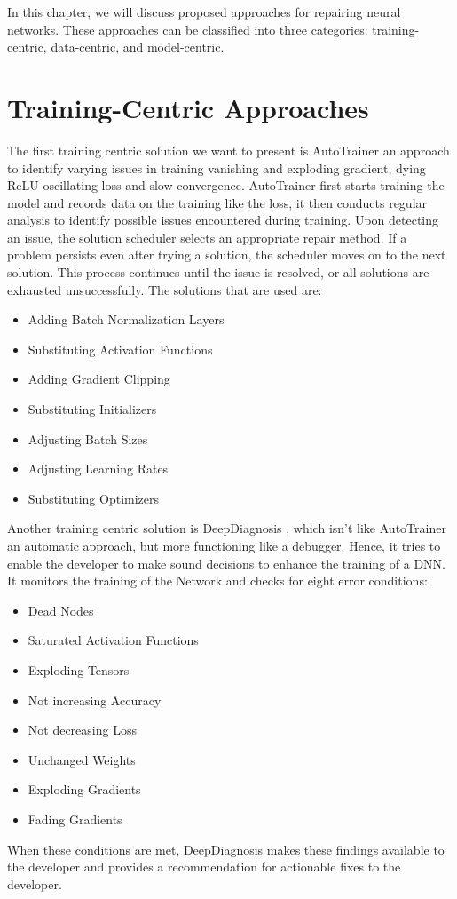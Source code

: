 In this chapter, we will discuss proposed approaches for repairing neural networks.
These approaches \cite{nakagawa_experience_2023} can be classified into three categories: training-centric, data-centric, and model-centric.

\section{Training-Centric Approaches}\label{sec:training-centric-approaches}
The first training centric solution we want to present is AutoTrainer \cite{zhang_autotrainer_2021} an approach to identify varying issues in training vanishing and exploding gradient, dying ReLU oscillating loss and slow convergence.
AutoTrainer first starts training the model and records data on the training like the loss, it then conducts regular analysis to identify possible issues encountered during training.
Upon detecting an issue, the solution scheduler selects an appropriate repair method.
If a problem persists even after trying a solution, the scheduler moves on to the next solution.
This process continues until the issue is resolved, or all solutions are exhausted unsuccessfully.
The solutions that are used are:
\begin{itemize}
    \item Adding Batch Normalization Layers
    \item Substituting Activation Functions
    \item Adding Gradient Clipping
    \item Substituting Initializers
    \item Adjusting Batch Sizes
    \item Adjusting Learning Rates
    \item Substituting Optimizers
\end{itemize}
Another training centric solution is DeepDiagnosis \cite{wardat_deepdiagnosis_2021}, which isn't like AutoTrainer an automatic approach, but more functioning like a debugger.
Hence, it tries to enable the developer to make sound decisions to enhance the training of a DNN\@.
It monitors the training of the Network and checks for eight error conditions:
\begin{itemize}
    \item Dead Nodes
    \item Saturated Activation Functions
    \item Exploding Tensors
    \item Not increasing Accuracy
    \item Not decreasing Loss
    \item Unchanged Weights
    \item Exploding Gradients
    \item Fading Gradients
\end{itemize}
When these conditions are met, DeepDiagnosis makes these findings available to the developer and provides a recommendation for actionable fixes to the developer.

